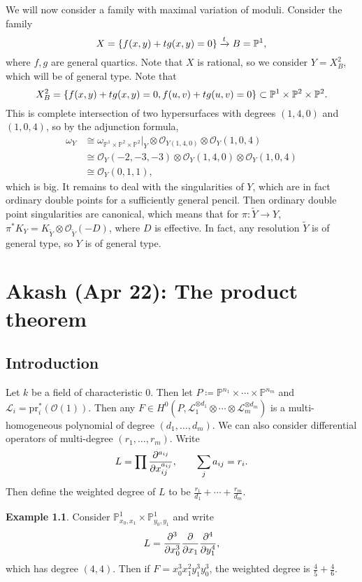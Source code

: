 \documentclass[leqno, openany]{memoir}
\theoremstyle{definition}
\newtheorem{exm}[thm]{Example}
\theoremstyle{remark}
\theoremstyle{plain}
\theoremstyle{definition}
\theoremstyle{remark}
\renewcommand{\P}{\mathbb{P}}
\newcommand{\mc}[1]{\mathcal{#1}}
\newcommand{\mr}[1]{\mathrm{#1}}
\newcommand{\wt}[1]{\widetilde{#1}}
\begin{document}
We will now consider a family with maximal variation of moduli. Consider the family
\[ X = \qty{f(x,y) + t g(x,y) = 0} \xrightarrow{t} B = \P^1, \]
where $f, g$ are general quartics. Note that $X$ is rational, so we consider $Y = X_B^2$, which will be of general type. Note that
\[ X_B^2 = \qty{f(x,y)+tg(x,y) = 0, f(u,v)+t g(u,v) = 0} \subset \P^1 \times \P^2 \times \P^2. \]
This is complete intersection of two hypersurfaces with degrees $(1,4,0)$ and $(1,0,4)$, so by the adjunction formula,
\begin{align*}
    \omega_Y &\cong \omega_{\P^1 \times \P^2 \times \P^2}|_Y \otimes \mc{O}_{Y(1,4,0)} \otimes \mc{O}_{Y}(1,0,4) \\
    &\cong \mc{O}_Y(-2, -3, -3) \otimes \mc{O}_Y(1,4,0) \otimes \mc{O}_Y(1,0,4) \\
    &\cong \mc{O}_Y(0,1,1),
\end{align*}
which is big. It remains to deal with the singularities of $Y$, which are in fact ordinary double points for a sufficiently general pencil. Then ordinary double point singularities are canonical, which means that for $\pi\colon \wt{Y} \to Y$, $\pi^* K_Y = K_{\wt{Y}} \otimes \mc{O}_{\wt{Y}}(-D)$, where $D$ is effective. In fact, any resolution $\wt{Y}$ is of general type, so $Y$ is of general type.

\chapter{Akash (Apr 22): The product theorem}%

\section{Introduction}

Let $k$ be a field of characteristic $0$. Then let $P \coloneqq \P^{n_1} \times \cdots \times \P^{n_m}$ and $\mc{L}_i = \mr{pr}_i^* (\mc{O}(1))$. Then any $F \in H^0(P, \mc{L}_1^{\otimes d_1} \otimes \cdots \otimes \mc{L}_m^{\otimes d_m})$ is a multi-homogeneous polynomial of degree $(d_1, \ldots, d_m)$. We can also consider differential operators of multi-degree $(r_1, \ldots, r_m)$. Write
\[ L = \prod \pdv[a_{ij}]{x_{ij}}, \qquad \sum_j a_{ij} = r_i. \]
Then define the weighted degree of $L$ to be $\frac{r_1}{d_1} + \cdots + \frac{r_m}{d_m}$.

\begin{exm}
    Consider $\P^1_{x_0,x_1} \times \P^1_{y_0, y_1}$ and write
    \[ L = \pdv[3]{x_0} \pdv{x_1} \pdv[4]{y_1}, \]
    which has degree $(4,4)$. Then if $F = x_0^3 x_1^2 y_1^3 y_0^3$, the weighted degree is $\frac{4}{5} + \frac{4}{6}$.
\end{exm}
\end{document}
